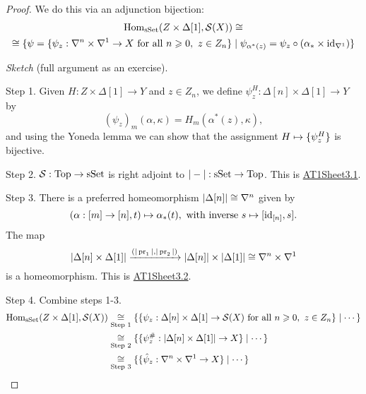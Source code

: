 \begin{proof}
We do this via an adjunction bijection:
\begin{multline*}
    \operatorname{Hom}_{\mathrm{sSet}}(Z\times\Delta[1],\mathcal{S}(X))\cong\\
    \cong\{\psi=\{\psi_z:\nabla^n\times\nabla^1\to X\text{ for all } n\geqslant0,\ z\in Z_n\}\mid\psi_{\alpha^*(z)}=\psi_z\circ(\alpha_*  \times\operatorname{id}_{\nabla^1})\}
\end{multline*}

\textit{Sketch} (full argument as an exercise).

Step 1. Given $H:Z\times\Delta[1]\to Y$ and $z\in Z_n$, we define $\psi^H_z:\Delta[n]\times\Delta[1]\to Y$ by
\[(\psi_z)_m(\alpha,\kappa)=H_m(\alpha^*(z),\kappa),\]
and using the Yoneda lemma we can show that the assignment $H\mapsto\{\psi^H_z\}$ is bijective.

Step 2. $\mathcal{S}:{\mathrm{Top}}\to{\mathrm{sSet}}$ is right adjoint to $|-|:{\mathrm{sSet}}\to{\mathrm{Top}}$. This is \hyperref[exercise:AT1Sheet3.1]{AT1Sheet3.1}.

Step 3. There is a preferred homeomorphism $|\Delta[n]|\cong\nabla^n$ given by
\[(\alpha:[m]\to[n],t)\mapsto\alpha_*(t),\text{ with inverse }s\mapsto[\operatorname{id}_{[n]},s].\] The map
\[|\Delta[n]\times\Delta[1]|\xrightarrow{(|\operatorname{pr}_1|,|\operatorname{pr}_2|)}|\Delta[n]|\times|\Delta[1]|\cong\nabla^n\times\nabla^{1}\]
is a homeomorphism. This is \hyperref[exercise:AT1Sheet3.2]{AT1Sheet3.2}.

Step 4. Combine steps 1-3.
\begin{align*}
    \operatorname{Hom}_{\mathrm{sSet}}(Z\times\Delta[1],\mathcal{S}(X))&\underset{\text{Step 1}}{\cong}\{\{\psi_z:\Delta[n]\times\Delta[1]\to\mathcal{S}(X)\text{ for all } n\geqslant0,\ z\in Z_n\}\mid\cdots\}\\
    &\underset{\text{Step 2}}{\cong}\{\{\psi_z^\#:|\Delta[n]\times\Delta[1]|\to X\}\mid\cdots\}\\
    &\underset{\text{Step 3}}{\cong}\{\{\hat\psi_z:\nabla^n\times\nabla^{1}\to X\}\mid\cdots\}
\end{align*}

\end{proof}

